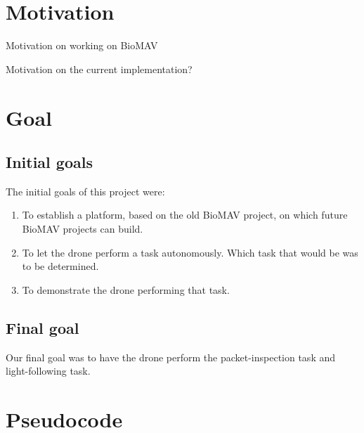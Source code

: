 \documentclass[a4paper,10pt]{article}
\begin{document}
\section{Motivation}
Motivation on working on BioMAV

Motivation on the current implementation?

\section{Goal}
\subsection{Initial goals}
The initial goals of this project were:
\begin{enumerate}
\item To establish a platform, based on the old BioMAV project, on which
      future BioMAV projects can build.
\item To let the drone perform a task autonomously. Which task that would be
      was to be determined.
\item To demonstrate the drone performing that task.
\end{enumerate}
\subsection{Final goal}
Our final goal was to have the drone perform the packet-inspection task and
light-following task.



\section{Pseudocode}
\end{document}
